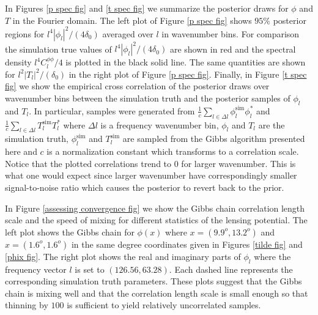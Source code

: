 \documentclass[iop,revtex4,apj,onecolumn]{emulateapj}
\begin{document}
In Figures \ref{p spec fig} and \ref{t spec fig} we summarize the posterior draws for $\phi$ and $T$ in the Fourier domain. The left plot of Figure \ref{p spec fig} shows $95\%$ posterior regions for  $l^4|\phi_l|^2/(4\delta_0)$  averaged over $l$ in wavenumber bins. For comparison the simulation true values of  $l^4|\phi_l|^2/(4\delta_0)$ are shown in red and the spectral density $l^4 C^{\phi\phi}_l/4$ is plotted in the black solid line. 
The same quantities are shown for $l^2|T_l|^2/(\delta_0)$ in the right plot of Figure \ref{p spec fig}. Finally, in Figure \ref{t spec fig} we show the empirical cross correlation of the posterior draws over wavenumber bins between the simulation truth and the posterior samples of $\phi_l$ and $T_l$. In particular,
samples were generated from $\frac{1}{c}\sum_{l\in \Delta l} \phi^\text{sim}_l\phi^*_l $ and $\frac{1}{c}\sum_{l\in \Delta l} T^\text{sim}_lT^*_l $ where $\Delta l$ is a frequency wavenumber bin,  $\phi_l$ and $T_l$ are the simulation truth, $\phi^\text{sim}_l$  and $T^\text{sim}_l$  are sampled from the Gibbs algorithm presented here and $c$ is a normalization constant which transforms to a correlation scale.  Notice that the plotted correlations trend to $0$ for larger wavenumber. This is what one would expect since larger wavenumber have correspondingly smaller signal-to-noise ratio which causes the posterior to revert back to the prior. 



In Figure \ref{assessing convergence fig}  we show the Gibbs chain correlation length scale  and the speed of mixing for different statistics of the lensing potential. The left plot shows the Gibbs chain for $\phi(x)$ where $x = (9.9^o, 13.2^o)$ and $x = (1.6^o, 1.6^o)$ in the same degree coordinates given in Figures \ref{tilde fig} and \ref{phix fig}. The right plot shows the real and imaginary parts of $\phi_l$ where the frequency vector $l$ is set to  $(126.56,63.28)$. Each dashed line represents the corresponding simulation truth parameters. These plots suggest that the Gibbs chain is mixing well and that the correlation length scale is small enough so that thinning by $100$ is sufficient to yield relatively uncorrelated samples. 
\end{document}
